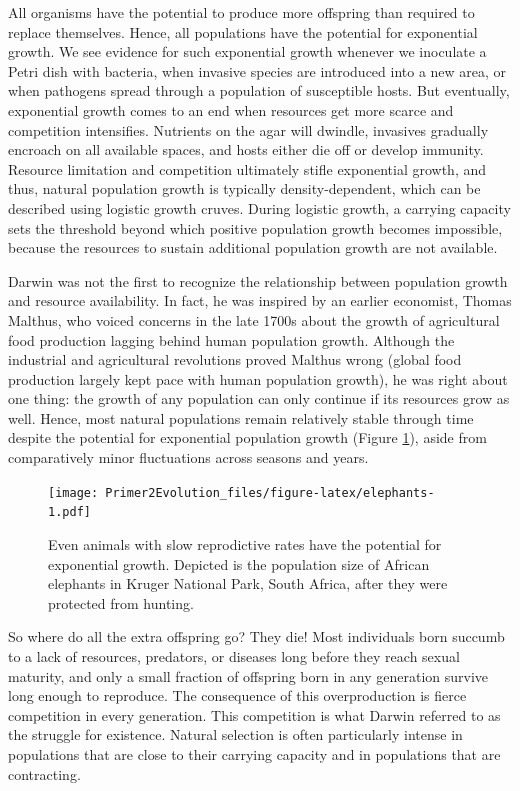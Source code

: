 \documentclass[
]{book}
\begin{document}
All organisms have the potential to produce more offspring than required to replace themselves. Hence, all populations have the potential for exponential growth. We see evidence for such exponential growth whenever we inoculate a Petri dish with bacteria, when invasive species are introduced into a new area, or when pathogens spread through a population of susceptible hosts. But eventually, exponential growth comes to an end when resources get more scarce and competition intensifies. Nutrients on the agar will dwindle, invasives gradually encroach on all available spaces, and hosts either die off or develop immunity. Resource limitation and competition ultimately stifle exponential growth, and thus, natural population growth is typically density-dependent, which can be described using logistic growth cruves. During logistic growth, a carrying capacity sets the threshold beyond which positive population growth becomes impossible, because the resources to sustain additional population growth are not available.

Darwin was not the first to recognize the relationship between population growth and resource availability. In fact, he was inspired by an earlier economist, Thomas Malthus, who voiced concerns in the late 1700s about the growth of agricultural food production lagging behind human population growth. Although the industrial and agricultural revolutions proved Malthus wrong (global food production largely kept pace with human population growth), he was right about one thing: the growth of any population can only continue if its resources grow as well. Hence, most natural populations remain relatively stable through time despite the potential for exponential population growth (Figure \ref{fig:elephants}), aside from comparatively minor fluctuations across seasons and years.

\begin{figure}
\centering
\texttt{[image: Primer2Evolution\_files/figure-latex/elephants-1.pdf]}
\caption{\label{fig:elephants}Even animals with slow reprodictive rates have the potential for exponential growth. Depicted is the population size of African elephants in Kruger National Park, South Africa, after they were protected from hunting.}
\end{figure}

So where do all the extra offspring go? They die! Most individuals born succumb to a lack of resources, predators, or diseases long before they reach sexual maturity, and only a small fraction of offspring born in any generation survive long enough to reproduce. The consequence of this overproduction is fierce competition in every generation. This competition is what Darwin referred to as the struggle for existence. Natural selection is often particularly intense in populations that are close to their carrying capacity and in populations that are contracting.
\end{document}
